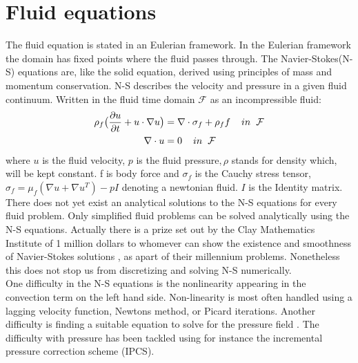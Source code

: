 
\section{Fluid equations}
The fluid equation is stated in an Eulerian framework. In the Eulerian framework the domain has fixed points where the fluid passes through. 
The Navier-Stokes(N-S) equations are, like the solid equation, derived using principles of mass and momentum conservation. N-S describes the velocity and pressure in a given fluid continuum. Written in the fluid time domain $\mathcal{F}$ as an incompressible fluid:
\begin{align}
\label{eq:NS}
\rho_f\big( \frac{\partial u}{\partial t} +  u \cdot \nabla u\big) &= \nabla \cdot \sigma_f + \rho_ff  \hspace{4mm} in \hspace{2mm} \mathcal{F}\\
\nabla \cdot u &= 0 \hspace{4mm} in \hspace{2mm} \mathcal{F}
\end{align}
where $u$ is the fluid velocity, $p$ is the fluid pressure$, \rho$ stands for density which, will be kept constant. f is body force and $\sigma_f$ is the Cauchy stress tensor, $ \sigma_f = \mu_f (\nabla u + \nabla u^T)  - pI$ denoting a newtonian fluid. $I$ is the Identity matrix. \\

There does not yet exist an analytical solutions to the N-S equations for every fluid problem. Only simplified fluid problems can be solved \cite{White2000} analytically using the N-S equations. Actually there is a prize set out by the Clay Mathematics Institute of 1 million dollars to whomever can show the existence and smoothness of Navier-Stokes solutions \cite{Fefferman2000}, as apart of their millennium problems. 
Nonetheless this does not stop us from discretizing and solving N-S numerically. \\

One difficulty in the N-S equations is the nonlinearity appearing in the convection term on the left hand side. Non-linearity is most often handled using a lagging velocity function, Newtons method, or Picard iterations. Another difficulty is finding a suitable equation to solve for the pressure field \cite{Charlesworth}. The difficulty with pressure has been tackled using for instance the incremental pressure correction scheme (IPCS).